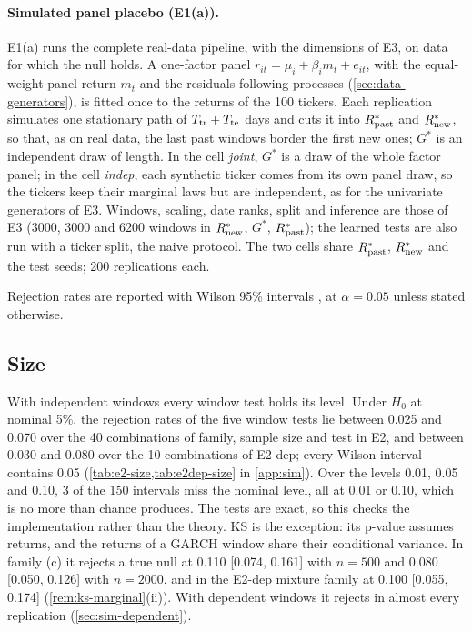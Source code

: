 \paragraph{Simulated panel placebo (E1(a)).}
E1(a) runs the complete real-data pipeline, with the dimensions of E3, on data for which the null
holds. A one-factor panel $r_{it}=\mu_i+\beta_im_t+e_{it}$, with the equal-weight panel return
$m_t$ and the residuals following \GARCHt{} processes (\cref{sec:data-generators}), is fitted once to
the \TRAIN{} returns of the 100 tickers. Each replication simulates one stationary path of
$T_{\mathrm{tr}}+T_{\mathrm{te}}$ days and cuts it into $R_{\mathrm{past}}^*$ and $R_{\mathrm{new}}^*$, so that, as on real data, the last past
windows border the first new ones; $G^*$ is an independent draw of \TEST{} length. In the cell
\emph{joint}, $G^*$ is a draw of the whole factor panel; in the cell \emph{indep}, each synthetic
ticker comes from its own panel draw, so the tickers keep their marginal laws but are independent,
as for the univariate generators of E3. Windows, scaling, date ranks, split and inference are
those of E3 (3000, 3000 and 6200 windows in $R_{\mathrm{new}}^*$, $G^*$, $R_{\mathrm{past}}^*$); the learned tests are also
run with a ticker split, the naive protocol. The two cells share $R_{\mathrm{past}}^*$, $R_{\mathrm{new}}^*$ and the test
seeds; 200 replications each.

Rejection rates are reported with Wilson 95\% intervals \citep{wilson_1927_probable}, at
$\alpha=0.05$ unless stated otherwise.

\subsection{Size}\label{sec:sim-size}

With independent windows every window test holds its level. Under $H_0$ at nominal 5\%, the
rejection rates of the five window tests lie between 0.025 and 0.070 over the 40 combinations of
family, sample size and test in E2, and between 0.030 and 0.080 over the 10 combinations of E2-dep;
every Wilson interval contains 0.05 (\cref{tab:e2-size,tab:e2dep-size} in \cref{app:sim}). Over the
levels 0.01, 0.05 and 0.10, 3 of the 150 intervals miss the nominal level, all at 0.01 or 0.10,
which is no more than chance produces. The tests are exact, so this checks the implementation
rather than the theory. KS is the exception: its p-value assumes \iid{} returns, and the returns of
a GARCH window share their conditional variance. In family (c) it rejects a true null at 0.110
[0.074, 0.161] with $n=500$ and 0.080 [0.050, 0.126] with $n=2000$, and in the E2-dep mixture family
at 0.100 [0.055, 0.174] (\cref{rem:ks-marginal}(ii)). With dependent windows it rejects in almost
every replication (\cref{sec:sim-dependent}).

